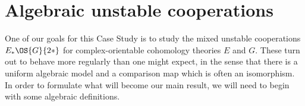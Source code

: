 










\section{Algebraic unstable cooperations}

One of our goals for this Case Study is to study the mixed unstable cooperations $E_* \OS{G}{2*}$ for complex-orientable cohomology theories $E$ and $G$.  These turn out to behave more regularly than one might expect, in the sense that there is a uniform algebraic model and a comparison map which is often an isomorphism.  In order to formulate what will become our main result, we will need to begin with some algebraic definitions.

